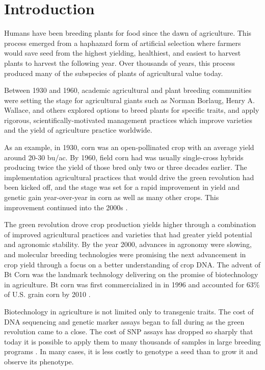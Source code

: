 \section{Introduction} \label{sec:gen-intro}

Humans have been breeding plants for food since the dawn of agriculture. This process
emerged from a haphazard form of artificial selection where farmers would save seed from the 
highest yielding, healthiest, and easiest to harvest plants to harvest the following year. 
Over thousands of years, this process produced many of the subspecies of plants of  
agricultural value today.

Between 1930 and 1960, academic agricultural and plant breeding communities were setting the
stage for agricultural giants such as Norman Borlaug, Henry A. Wallace, and others explored 
options to breed plants for specific traits, and apply rigorous, scientifically-motivated 
management practices which improve varieties and the yield of agriculture practice worldwide.

As an example, in 1930, corn was an open-pollinated crop with an average 
yield around 20-30 bu/ac. By 1960, field corn had was usually single-cross hybrids 
producing twice the yield of those bred only two or three decades earlier. The implementation
agricultural practices that would drive the green revolution had been kicked off, and
the stage was set for a rapid improvement in yield and genetic gain year-over-year in
corn as well as many other crops. This improvement continued into the 2000s \citep{evenson2003}.

The green revolution drove crop production yields higher through a combination of 
improved agricultural practices and varieties that had greater yield potential
and agronomic stability. By the year 2000, advances in agronomy were slowing, and 
molecular breeding technologies were promising the next advancement in crop yield
through a focus on a better understanding of crop DNA. The advent of Bt Corn was the
landmark technology delivering on the promise of biotechnology in agriculture.
Bt corn was first commercialized in in 1996 and accounted for 63\% of U.S. grain 
corn by 2010 \citep{fernandez2012}. 

Biotechnology in agriculture is not limited only to transgenic traits. The cost of 
DNA sequencing and genetic marker assays began to fall during as the green revolution
came to a close. The cost of SNP assays has dropped so sharply that today it is 
possible to apply them to many thousands of samples in large breeding programs \citep{hiremath2012}. 
In many cases, it is less costly to genotype a seed than to grow it and observe its phenotype.

